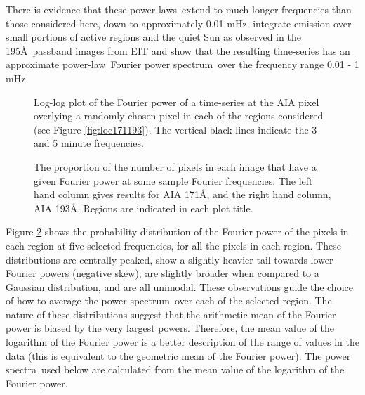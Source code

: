 \documentclass[onecolumn]{emulateapj}
\newcommand{\PS}{power spectrum}
\newcommand{\PA}{power spectra}
\newcommand{\PL}{power-law}
\newcommand{\PLs}{power-laws}
\newcommand{\Fps}{Fourier \PS}
\newcommand{\BF}{ }
\begin{document}
There is evidence that these \PLs\ extend to much longer
frequencies than those considered here, down to approximately 0.01
mHz. \cite{2014AA...563A...8A} integrate emission over small portions
of active regions and the quiet Sun as observed in the 195\AA\ passband
images from EIT and show that the resulting time-series has an
approximate \PL\ \Fps\ over the frequency range 0.01 - 1 mHz.

\begin{figure}
\centerline{
}
\centerline{
}
\caption{Log-log plot of the Fourier power of a time-series at the AIA
  pixel overlying a randomly chosen pixel in each of the regions
  considered (see Figure \protect\ref{fig:loc171193}).  The vertical
  black lines indicate the 3 and 5 minute frequencies.}
\label{fig:compare171193}
\end{figure}

\begin{figure}
\centerline{
}
\centerline{
}
\centerline{
}
\centerline{
}
\caption{{\BF The proportion of the number of pixels in each image
    that have a given Fourier power at some sample Fourier
    frequencies.  The left hand column gives results for AIA 171\AA,
    and the right hand column, AIA 193\AA.  Regions are indicated in
    each plot title.}}
\label{fig:dist171193}
\end{figure}
Figure \ref{fig:dist171193} shows the probability distribution of the
Fourier power of the pixels in each region at five selected
frequencies, for all the pixels in each region.  These distributions
are centrally peaked, show a slightly heavier tail towards lower
Fourier powers (negative skew), are slightly broader when compared to
a Gaussian distribution, and are all unimodal.  These observations
guide the choice of how to average the \PS\ over each of the selected
region.  The nature of these distributions suggest that the arithmetic
mean of the Fourier power is biased by the very largest powers.
Therefore, the mean value of the logarithm of the Fourier power is a
better description of the range of values in the data (this is
equivalent to the geometric mean of the Fourier power).  The \PA\ used
below are calculated from the mean value of the logarithm of the
Fourier power.
\end{document}
